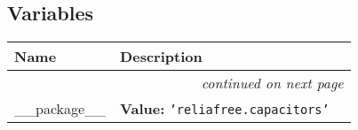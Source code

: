 
  \subsection{Variables}

    \vspace{-1cm}
\hspace{\varindent}\begin{longtable}{|p{\varnamewidth}|p{\vardescrwidth}|l}
\cline{1-2}
\cline{1-2} \centering \textbf{Name} & \centering \textbf{Description}& \\
\cline{1-2}
\endhead\cline{1-2}\multicolumn{3}{r}{\small\textit{continued on next page}}\\\endfoot\cline{1-2}
\endlastfoot\raggedright \_\-\_\-p\-a\-c\-k\-a\-g\-e\-\_\-\_\- & \raggedright \textbf{Value:} 
{\tt \texttt{'}\texttt{reliafree.capacitors}\texttt{'}}&\\
\cline{1-2}
\end{longtable}

